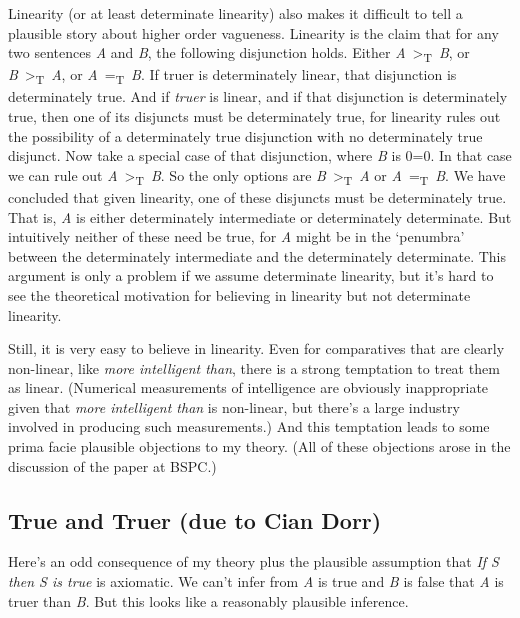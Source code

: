 \documentclass[
  11pt,
  letterpaper,
  DIV=11,
  numbers=noendperiod,
  twoside]{scrartcl}
\begin{document}
Linearity (or at least determinate linearity) also makes it difficult to
tell a plausible story about higher order vagueness. Linearity is the
claim that for any two sentences \emph{A} and \emph{B}, the following
disjunction holds. Either
\emph{A}~\textgreater{}\textsubscript{T}~\emph{B}, or
\emph{B}~\textgreater{}\textsubscript{T}~\emph{A}, or
\emph{A}~=\textsubscript{T}~\emph{B}. If truer is determinately linear,
that disjunction is determinately true. And if \emph{truer} is linear,
and if that disjunction is determinately true, then one of its disjuncts
must be determinately true, for linearity rules out the possibility of a
determinately true disjunction with no determinately true disjunct. Now
take a special case of that disjunction, where \emph{B} is 0=0. In that
case we can rule out \emph{A}~\textgreater{}\textsubscript{T}~\emph{B}.
So the only options are
\emph{B}~\textgreater{}\textsubscript{T}~\emph{A} or
\emph{A}~=\textsubscript{T}~\emph{B}. We have concluded that given
linearity, one of these disjuncts must be determinately true. That is,
\emph{A} is either determinately intermediate or determinately
determinate. But intuitively neither of these need be true, for \emph{A}
might be in the `penumbra' between the determinately intermediate and
the determinately determinate. This argument is only a problem if we
assume determinate linearity, but it's hard to see the theoretical
motivation for believing in linearity but not determinate linearity.

Still, it is very easy to believe in linearity. Even for comparatives
that are clearly non-linear, like \emph{more intelligent than}, there is
a strong temptation to treat them as linear. (Numerical measurements of
intelligence are obviously inappropriate given that \emph{more
intelligent than} is non-linear, but there's a large industry involved
in producing such measurements.) And this temptation leads to some prima
facie plausible objections to my theory. (All of these objections arose
in the discussion of the paper at BSPC.)

\subsection*{True and Truer (due to Cian
Dorr)}\label{true-and-truer-due-to-cian-dorr}

Here's an odd consequence of my theory plus the plausible assumption
that \emph{If S then S is true} is axiomatic. We can't infer from
\emph{A} is true and \emph{B} is false that \emph{A} is truer than
\emph{B}. But this looks like a reasonably plausible inference.
\end{document}
